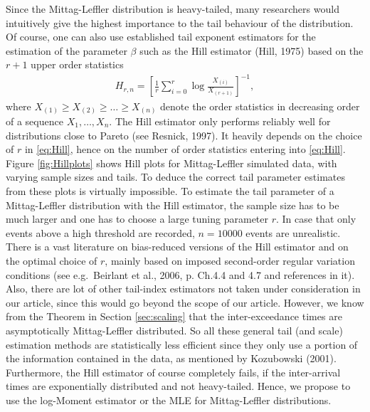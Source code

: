 \documentclass[]{elsarticle} %
\begin{document}
Since the Mittag-Leffler distribution is heavy-tailed, many researchers
would intuitively give the highest importance to the tail behaviour of
the distribution. Of course, one can also use established tail exponent
estimators for the estimation of the parameter \(\beta\) such as the
Hill estimator (Hill, 1975) based on the \(r+1\) upper order statistics
\begin{align}\label{eq:Hill}
H_{r,n}=\left[ \frac{1}{r} \sum_{i=0}^{r} \log \frac{X_{(i)}}{X_{(r+1)}}\right]^{-1}, 
\end{align} where \(X_{(1)} \geq X_{(2)} \geq \ldots \geq X_{(n)}\)
denote the order statistics in decreasing order of a sequence
\(X_1,\ldots,X_n\). The Hill estimator only performs reliably well for
distributions close to Pareto (see Resnick, 1997). It heavily depends on
the choice of \(r\) in \eqref{eq:Hill}, hence on the number of order
statistics entering into \eqref{eq:Hill}. Figure \ref{fig:Hillplots}
shows Hill plots for Mittag-Leffler simulated data, with varying sample
sizes and tails. To deduce the correct tail parameter estimates from
these plots is virtually impossible. To estimate the tail parameter of a
Mittag-Leffler distribution with the Hill estimator, the sample size has
to be much larger and one has to choose a large tuning parameter \(r\).
In case that only events above a high threshold are recorded,
\(n=10000\) events are unrealistic. There is a vast literature on
bias-reduced versions of the Hill estimator and on the optimal choice of
\(r\), mainly based on imposed second-order regular variation conditions
(see e.g.~Beirlant et al., 2006, p. Ch.4.4 and 4.7 and references in
it). Also, there are lot of other tail-index estimators not taken under
consideration in our article, since this would go beyond the scope of
our article. However, we know from the Theorem in Section
\ref{sec:scaling} that the inter-exceedance times are asymptotically
Mittag-Leffler distributed. So all these general tail (and scale)
estimation methods are statistically less efficient since they only use
a portion of the information contained in the data, as mentioned by
Kozubowski (2001). Furthermore, the Hill estimator of course completely
fails, if the inter-arrival times are exponentially distributed and not
heavy-tailed. Hence, we propose to use the log-Moment estimator or the
MLE for Mittag-Leffler distributions.
\end{document}
